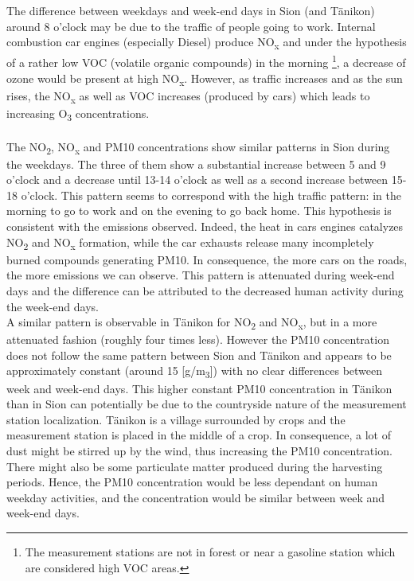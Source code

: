 \documentclass[a4paper, 12pt]{article}
\begin{document}
    The difference between weekdays and week-end days in Sion (and Tänikon) around 8 o'clock may be due to the traffic of people going to work. Internal combustion car engines (especially Diesel) produce NO\textsubscript{x} and under the hypothesis of a rather low VOC (volatile organic compounds) in the morning \footnote{The measurement stations are not in forest or near a gasoline station which are considered high VOC areas.}, a decrease of ozone would be present at high NO\textsubscript{x}. However, as traffic increases and as the sun rises, the NO\textsubscript{x} as well as VOC increases (produced by cars) which leads to increasing O\textsubscript{3} concentrations.
    \\
    \\
    The NO\textsubscript{2}, NO\textsubscript{x} and PM10 concentrations show similar patterns in Sion during the weekdays. The three of them show a substantial increase between 5 and 9 o'clock and a decrease until 13-14 o'clock as well as a second increase between 15-18 o'clock. This pattern seems to correspond with the high traffic pattern: in the morning to go to work and on the evening to go back home. This hypothesis is consistent with the emissions observed. Indeed, the heat in cars engines catalyzes NO\textsubscript{2} and NO\textsubscript{x} formation, while the car exhausts release many incompletely burned compounds generating PM10. In consequence, the  more cars on the roads, the more emissions we can observe. This pattern is attenuated during week-end days and the difference can be attributed to the decreased human activity during the week-end days. 
    \\
    A similar pattern is observable in Tänikon for NO\textsubscript{2} and NO\textsubscript{x}, but in a more attenuated fashion (roughly four times less). However the PM10 concentration does not follow the same pattern between Sion and Tänikon and appears to be approximately constant (around 15 [\textmu g/m\textsubscript{3}]) with no clear differences between week and week-end days. This higher constant PM10 concentration in Tänikon than in Sion can potentially be due to the countryside nature of the measurement station localization. Tänikon is a village surrounded by crops and the measurement station is placed in the middle of a crop. In consequence, a lot of dust might be stirred up by the wind, thus increasing the PM10 concentration. There might also be some particulate matter produced during the harvesting periods. Hence, the PM10 concentration would be less dependant on human weekday activities, and the concentration would be similar between week and week-end days. 
\end{document}
